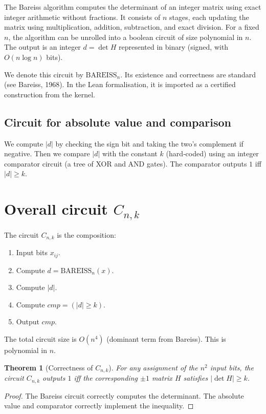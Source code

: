 \documentclass[11pt,a4paper]{article}
\newtheorem{theorem}{Theorem}[section]
\begin{document}
The Bareiss algorithm computes the determinant of an integer matrix using exact integer arithmetic without fractions. It consists of $n$ stages, each updating the matrix using multiplication, addition, subtraction, and exact division. For a fixed $n$, the algorithm can be unrolled into a boolean circuit of size polynomial in $n$. The output is an integer $d = \det H$ represented in binary (signed, with $O(n\log n)$ bits).

We denote this circuit by $\mathrm{BAREISS}_{n}$. Its existence and correctness are standard (see Bareiss, 1968). In the Lean formalisation, it is imported as a certified construction from the kernel.

\subsection{Circuit for absolute value and comparison}

We compute $|d|$ by checking the sign bit and taking the two's complement if negative. Then we compare $|d|$ with the constant $k$ (hard‑coded) using an integer comparator circuit (a tree of XOR and AND gates). The comparator outputs $1$ iff $|d| \ge k$.

\section{Overall circuit $C_{n,k}$}

The circuit $C_{n,k}$ is the composition:
\begin{enumerate}
\item Input bits $x_{ij}$.
\item Compute $d = \mathrm{BAREISS}_{n}(x)$.
\item Compute $|d|$.
\item Compute $cmp = (|d| \ge k)$.
\item Output $cmp$.
\end{enumerate}
The total circuit size is $O(n^4)$ (dominant term from Bareiss). This is polynomial in $n$.

\begin{theorem}[Correctness of $C_{n,k}$]
For any assignment of the $n^2$ input bits, the circuit $C_{n,k}$ outputs $1$ iff the corresponding $\pm1$ matrix $H$ satisfies $|\det H| \ge k$.
\end{theorem}
\begin{proof}
The Bareiss circuit correctly computes the determinant. The absolute value and comparator correctly implement the inequality.
\end{proof}
\end{document}
